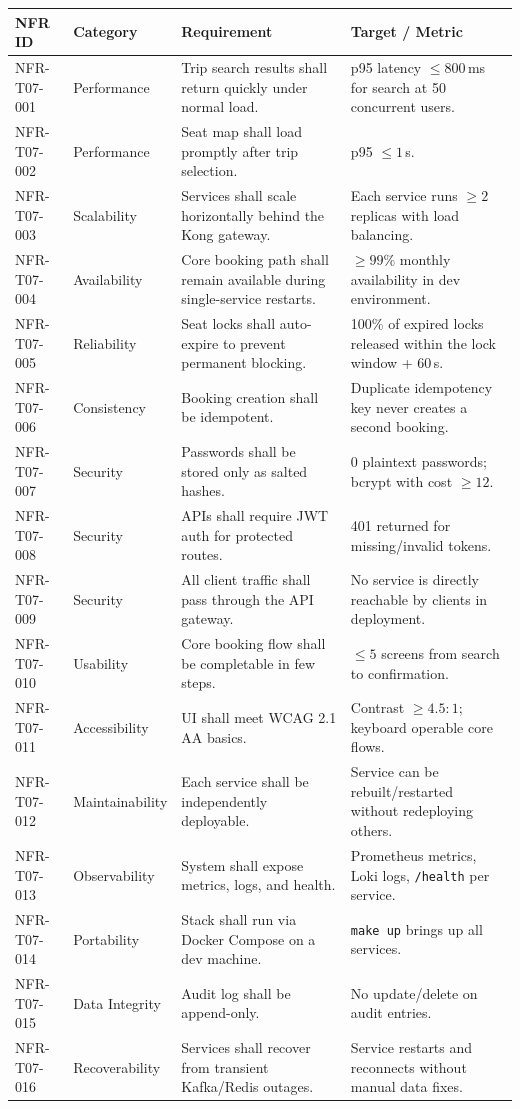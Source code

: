 \documentclass[11pt,a4paper]{article}
\newcommand{\rowstyle}{\rowcolor{headergray}}
\begin{document}
\begin{longtable}{p{2.1cm} p{2.4cm} Y Y}
\toprule
\rowstyle \textbf{NFR ID} & \textbf{Category} & \textbf{Requirement} & \textbf{Target / Metric} \\
\midrule
\endhead
NFR-T07-001 & Performance & Trip search results shall return quickly under normal load. & p95 latency $\leq 800$\,ms for search at 50 concurrent users. \\
NFR-T07-002 & Performance & Seat map shall load promptly after trip selection. & p95 $\leq 1$\,s. \\
NFR-T07-003 & Scalability & Services shall scale horizontally behind the Kong gateway. & Each service runs $\geq 2$ replicas with load balancing. \\
NFR-T07-004 & Availability & Core booking path shall remain available during single-service restarts. & $\geq 99\%$ monthly availability in dev environment. \\
NFR-T07-005 & Reliability & Seat locks shall auto-expire to prevent permanent blocking. & 100\% of expired locks released within the lock window + 60\,s. \\
NFR-T07-006 & Consistency & Booking creation shall be idempotent. & Duplicate idempotency key never creates a second booking. \\
NFR-T07-007 & Security & Passwords shall be stored only as salted hashes. & 0 plaintext passwords; bcrypt with cost $\geq 12$. \\
NFR-T07-008 & Security & APIs shall require JWT auth for protected routes. & 401 returned for missing/invalid tokens. \\
NFR-T07-009 & Security & All client traffic shall pass through the API gateway. & No service is directly reachable by clients in deployment. \\
NFR-T07-010 & Usability & Core booking flow shall be completable in few steps. & $\leq 5$ screens from search to confirmation. \\
NFR-T07-011 & Accessibility & UI shall meet WCAG 2.1 AA basics. & Contrast $\geq 4.5{:}1$; keyboard operable core flows. \\
NFR-T07-012 & Maintainability & Each service shall be independently deployable. & Service can be rebuilt/restarted without redeploying others. \\
NFR-T07-013 & Observability & System shall expose metrics, logs, and health. & Prometheus metrics, Loki logs, \texttt{/health} per service. \\
NFR-T07-014 & Portability & Stack shall run via Docker Compose on a dev machine. & \texttt{make up} brings up all services. \\
NFR-T07-015 & Data Integrity & Audit log shall be append-only. & No update/delete on audit entries. \\
NFR-T07-016 & Recoverability & Services shall recover from transient Kafka/Redis outages. & Service restarts and reconnects without manual data fixes. \\
\bottomrule
\end{longtable}
\end{document}
